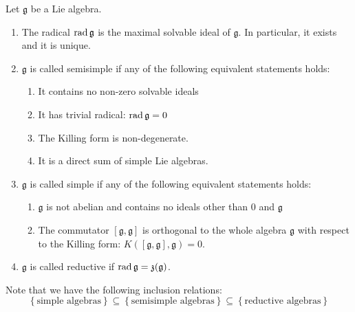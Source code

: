\documentclass{report}
\begin{document}
\begin{definition}
    Let $\mathfrak g$ be a Lie algebra.
    \begin{enumerate}[label = (\roman*)]
        \item The radical $\operatorname{rad} \mathfrak g$ is the maximal solvable ideal of $\mathfrak g$.
        In particular, it exists and it is unique.
        \item $\mathfrak g$ is called semisimple if any of the following equivalent statements holds:
        \begin{enumerate}[label=\alph*]
            \item It contains no non-zero solvable ideals
            \item  It has trivial radical: $\operatorname{rad} \mathfrak g = 0$
            \item The Killing form is non-degenerate.
            \item It is a direct sum of simple Lie algebras.
        \end{enumerate} 
        \item $\mathfrak g$ is called simple if any of the following equivalent statements holds:
        \begin{enumerate}[label = (\alph*)]
            \item $\mathfrak g$ is not abelian and contains no ideals other than $0$ and $\mathfrak g$
            \item The commutator $[\mathfrak g, \mathfrak g]$ is orthogonal to the whole algebra $\mathfrak g$ with respect to the Killing form: $K([\mathfrak g, \mathfrak g], \mathfrak g) = 0$.
        \end{enumerate}
        \item $\mathfrak g$ is called reductive if $\operatorname{rad} \mathfrak g = \mathfrak z(\mathfrak g)$.
    \end{enumerate}
\end{definition}
Note that we have the following inclusion relations:
\[
\left\{ \text{simple algebras} \right\} \subseteq \left\{ \text{semisimple algebras} \right\} \subseteq \left\{ \text{reductive algebras} \right\}
\]
\end{document}
